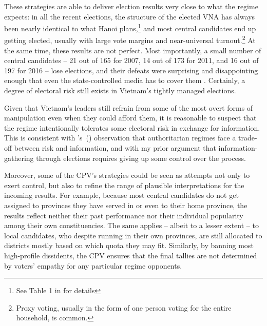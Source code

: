 \documentclass[12pt]{article}
\newcommand\citepos[1]{\citeauthor{#1}'s\ (\citeyear{#1})}
\newcommand{\1}{\mathbbm{1}}
\begin{document}
These strategies are able to deliver election results very close to what the regime expects: in all the recent elections, the structure of the elected VNA has always been nearly identical to what Hanoi plans,\footnote{See Table 1 in \citep[506][prefix]{MaleskySchuler2011} for  details} and most central candidates end up getting elected, usually with large vote margins and near-universal turnout.\footnote{Proxy voting, usually in the form of one person voting for the entire household, is common.} At the same time, these results are not perfect. Most importantly, a small number of central candidates -- 21 out of 165 for 2007, 14 out of 173 for 2011, and 16 out of 197 for 2016 -- lose elections, and their defeats were surprising and disappointing enough that even the state-controlled media has to cover them \citep[e.g.][]{vov2016, laodong2016}. Certainly, a degree of electoral risk still exists in Vietnam's tightly managed elections.

Given that Vietnam's leaders still refrain from some of the most overt forms of manipulation even when they could afford them, it is reasonable to suspect that the regime intentionally tolerates some electoral risk in exchange for information. This is consistent with \citepos{Wintrobe2000} observation that authoritarian regimes face a trade-off between risk and information, and with my prior argument that information-gathering through elections requires giving up some control over the process.

Moreover, some of the CPV's strategies could be seen as attempts not only to exert control, but also to refine the range of plausible interpretations for the incoming results. For example, because most central candidates do not get assigned to provinces they have served in or even to their home province, the results reflect neither their past performance nor their individual popularity among their own constituencies. The same applies -- albeit to a lesser extent -- to local candidates, who despite running in their own provinces, are still allocated to districts mostly based on which quota they may fit. Similarly, by banning most high-profile dissidents, the CPV ensures that the final tallies are not determined by voters' empathy for any particular regime opponents.
\end{document}
